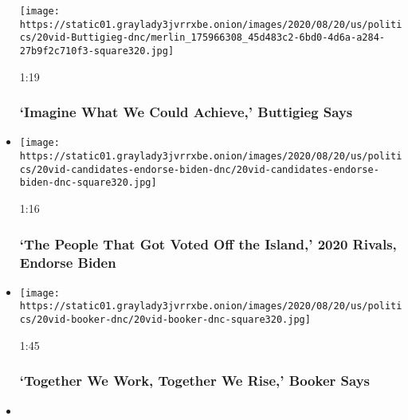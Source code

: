 \begin{itemize}
  \texttt{[image: https://static01.graylady3jvrrxbe.onion/images/2020/08/20/us/politics/20vid-Buttigieg-dnc/merlin\_175966308\_45d483c2-6bd0-4d6a-a284-27b9f2c710f3-square320.jpg]}

  1:19

  \hypertarget{imagine-what-we-could-achieve-buttigieg-says}{%
  \subsubsection{`Imagine What We Could Achieve,' Buttigieg
  Says}\label{imagine-what-we-could-achieve-buttigieg-says}}
\item
  \href{https://www.nytimes3xbfgragh.onion/video/us/elections/100000007299914/2020-candidates-endorse-biden-dnc.html?action=click\&module=video-series-bar\&region=header\&pgtype=Article\&playlistId=video/latest-video}{}

  \texttt{[image: https://static01.graylady3jvrrxbe.onion/images/2020/08/20/us/politics/20vid-candidates-endorse-biden-dnc/20vid-candidates-endorse-biden-dnc-square320.jpg]}

  1:16

  \hypertarget{the-people-that-got-voted-off-the-island-2020-rivals-endorse-biden}{%
  \subsubsection{`The People That Got Voted Off the Island,' 2020
  Rivals, Endorse
  Biden}\label{the-people-that-got-voted-off-the-island-2020-rivals-endorse-biden}}
\item
  \href{https://www.nytimes3xbfgragh.onion/video/us/elections/100000007299801/cory-booker-speaks-dnc.html?action=click\&module=video-series-bar\&region=header\&pgtype=Article\&playlistId=video/latest-video}{}

  \texttt{[image: https://static01.graylady3jvrrxbe.onion/images/2020/08/20/us/politics/20vid-booker-dnc/20vid-booker-dnc-square320.jpg]}

  1:45

  \hypertarget{together-we-work-together-we-rise-booker-says}{%
  \subsubsection{`Together We Work, Together We Rise,' Booker
  Says}\label{together-we-work-together-we-rise-booker-says}}
\item
  \href{https://www.nytimes3xbfgragh.onion/video/us/elections/100000007299848/tammy-duckworth-speaks-dnc.html?action=click\&module=video-series-bar\&region=header\&pgtype=Article\&playlistId=video/latest-video}{}


\end{itemize}
